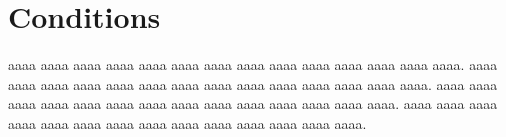 \documentclass[12pt,openany,english]{jsbook}        %
\begin{document}
%
%
%
\chapter{Conditions}
%
%
%
\begin{doublespace}
%
%
%
aaaa aaaa aaaa aaaa aaaa aaaa aaaa 
aaaa aaaa aaaa aaaa aaaa aaaa aaaa. 
aaaa aaaa aaaa aaaa aaaa aaaa aaaa 
aaaa aaaa aaaa aaaa aaaa aaaa aaaa. 
aaaa aaaa aaaa aaaa aaaa aaaa aaaa 
aaaa aaaa aaaa aaaa aaaa aaaa aaaa. 
aaaa aaaa aaaa aaaa aaaa aaaa aaaa 
aaaa aaaa aaaa aaaa aaaa aaaa aaaa. 
%
%
%
\end{doublespace}
%
%
%
\end{document}
